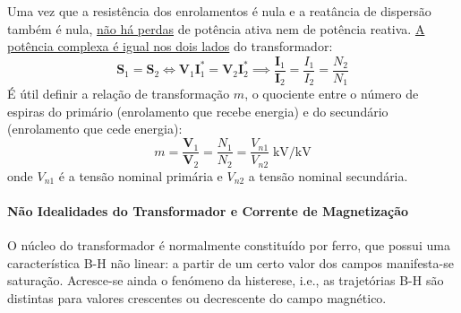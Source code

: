 \vspace{0.75em}
\noindent Uma vez que a resistência dos enrolamentos é nula e a reatância de dispersão também é nula, \underline{não há perdas} de potência ativa nem de potência reativa. \underline{A potência complexa é igual nos dois lados} do transformador:
$$
    \mathbf{S}_1 = \mathbf{S}_2 \iff \mathbf{V}_1 \mathbf{I}_1^* = \mathbf{V}_2 \mathbf{I}_2^* \implies \frac{\mathbf{I}_1}{\mathbf{I}_2} = \frac{I_1}{I_2} = \frac{N_2}{N_1}
$$
É útil definir a relação de transformação $m$, o quociente entre o número de espiras do primário (enrolamento que recebe energia) e do secundário (enrolamento que cede energia):
$$
    m = \frac{\mathbf{V}_1}{\mathbf{V}_2} = \frac{N_1}{N_2} = \frac{V_{n1}}{V_{n2}} \; \text{kV/kV}
$$
onde $V_{n1}$ é a tensão nominal primária e $V_{n2}$ a tensão nominal secundária.

\renewcommand{\thefootnote}{\fnsymbol{footnote}}
\renewcommand{\thefootnote}{\arabic{footnote}}

\paragraph{Não Idealidades do Transformador e Corrente de Magnetização}
\label{subsubsec:corrente-magnetizacao}

O núcleo do transformador é normalmente constituído por ferro, que possui uma característica B-H não linear: a partir de um certo valor dos campos manifesta-se saturação. Acresce-se ainda o fenómeno da histerese, i.e., as trajetórias B-H são distintas para valores crescentes ou decrescente do campo magnético.

